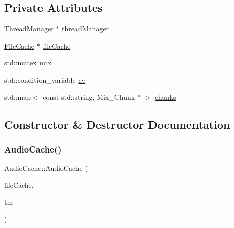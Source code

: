 \subsection*{Private Attributes}
\begin{DoxyCompactItemize}
\item 
\mbox{\hyperlink{classsage_1_1ThreadManager}{Thread\+Manager}} $\ast$ \mbox{\hyperlink{classsage_1_1AudioCache_a3b9b0b2a42ab08e28fe2e9d4ccbd97b2}{thread\+Manager}}
\item 
\mbox{\hyperlink{classsage_1_1FileCache}{File\+Cache}} $\ast$ \mbox{\hyperlink{classsage_1_1AudioCache_ae84b39a0913924ec3b3731748dff160f}{file\+Cache}}
\item 
std\+::mutex \mbox{\hyperlink{classsage_1_1AudioCache_a94ada12c063660c2fd9a0bc3b27f2bfd}{mtx}}
\item 
std\+::condition\+\_\+variable \mbox{\hyperlink{classsage_1_1AudioCache_a8bf8e2eb17634591e783c20a793c884f}{cv}}
\item 
std\+::map$<$ const std\+::string, Mix\+\_\+\+Chunk $\ast$ $>$ \mbox{\hyperlink{classsage_1_1AudioCache_a0aed8eaeb96481fe7ecceb6b0d05df69}{chunks}}
\end{DoxyCompactItemize}


\subsection{Constructor \& Destructor Documentation}
\mbox{\label{classsage_1_1AudioCache_a6fc6a4437b98c4ef0aa5d30f05c4c571}} 
\subsubsection{\texorpdfstring{AudioCache()}{AudioCache()}}
{\footnotesize\ttfamily Audio\+Cache\+::\+Audio\+Cache (\begin{DoxyParamCaption}\item[{\mbox{\hyperlink{classsage_1_1FileCache}{File\+Cache}} $\ast$}]{file\+Cache,  }\item[{\mbox{\hyperlink{classsage_1_1ThreadManager}{Thread\+Manager}} $\ast$}]{tm }\end{DoxyParamCaption})}

\mbox{\label{classsage_1_1AudioCache_a83e03cef642e3988abff4846c2b962d3}} 
